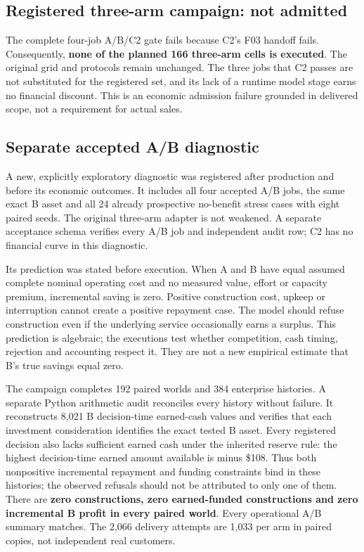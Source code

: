 \subsection{Registered three-arm campaign: not admitted}
The complete four-job A/B/C2 gate fails because C2's F03 handoff fails. Consequently, \textbf{none of the planned 166 three-arm cells is executed}. The original grid and protocols remain unchanged. The three jobs that C2 passes are not substituted for the registered set, and its lack of a runtime model stage earns no financial discount. This is an economic admission failure grounded in delivered scope, not a requirement for actual sales.

\subsection{Separate accepted A/B diagnostic}
A new, explicitly exploratory diagnostic was registered after production and before its economic outcomes. It includes all four accepted A/B jobs, the same exact B asset and all 24 already prospective no-benefit stress cases with eight paired seeds. The original three-arm adapter is not weakened. A separate acceptance schema verifies every A/B job and independent audit row; C2 has no financial curve in this diagnostic.

Its prediction was stated before execution. When A and B have equal assumed complete nominal operating cost and no measured value, effort or capacity premium, incremental saving is zero. Positive construction cost, upkeep or interruption cannot create a positive repayment case. The model should refuse construction even if the underlying service occasionally earns a surplus. This prediction is algebraic; the executions test whether competition, cash timing, rejection and accounting respect it. They are not a new empirical estimate that B's true savings equal zero.

The campaign completes 192 paired worlds and 384 enterprise histories. A separate Python arithmetic audit reconciles every history without failure. It reconstructs 8,021 B decision-time earned-cash values and verifies that each investment consideration identifies the exact tested B asset. Every registered decision also lacks sufficient earned cash under the inherited reserve rule: the highest decision-time earned amount available is minus \$108. Thus both nonpositive incremental repayment and funding constraints bind in these histories; the observed refusals should not be attributed to only one of them. There are \textbf{zero constructions, zero earned-funded constructions and zero incremental B profit in every paired world}. Every operational A/B summary matches. The 2,066 delivery attempts are 1,033 per arm in paired copies, not independent real customers.

